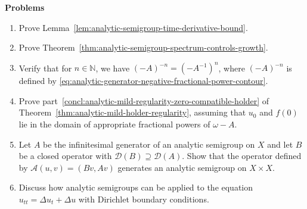 \textbf{Problems}

\begin{enumerate}[label=\thesection.\arabic*.,ref=\thesection.\arabic*,start=20,series=book-problems]

\item\label{ex:analytic-semigroup-derivative-bound-proof} Prove Lemma~\ref{lem:analytic-semigroup-time-derivative-bound}.

\item\label{ex:analytic-semigroup-spectral-growth-proof} Prove Theorem~\ref{thm:analytic-semigroup-spectrum-controls-growth}.

\item\label{ex:fractional-power-integer-inverse-identity} Verify that for $n\in\mathbb{N}$, we have $(-A)^{-n}=(-A^{-1})^n$, where $(-A)^{-n}$ is defined by \eqref{eq:analytic-generator-negative-fractional-power-contour}.

\item\label{ex:analytic-mild-fractional-compatible-initial-regularity} Prove part~\ref{concl:analytic-mild-regularity-zero-compatible-holder} of Theorem~\ref{thm:analytic-mild-holder-regularity}, assuming that $u_0$ and $f(0)$ lie in the domain of appropriate fractional powers of $\omega-A$.

\item\label{ex:analytic-semigroup-off-diagonal-product-space-generator} Let $A$ be the infinitesimal generator of an analytic semigroup on $X$ and let $B$ be a closed operator with $\mathcal{D}(B)\supseteq\mathcal{D}(A)$. Show that the operator defined by $\mathcal{A}(u,v)=(Bv,Av)$ generates an analytic semigroup on $X\times X$.

\item\label{ex:analytic-semigroup-strongly-damped-wave-equation} Discuss how analytic semigroups can be applied to the equation $u_{tt}=\Delta u_t+\Delta u$ with Dirichlet boundary conditions.

\end{enumerate}
